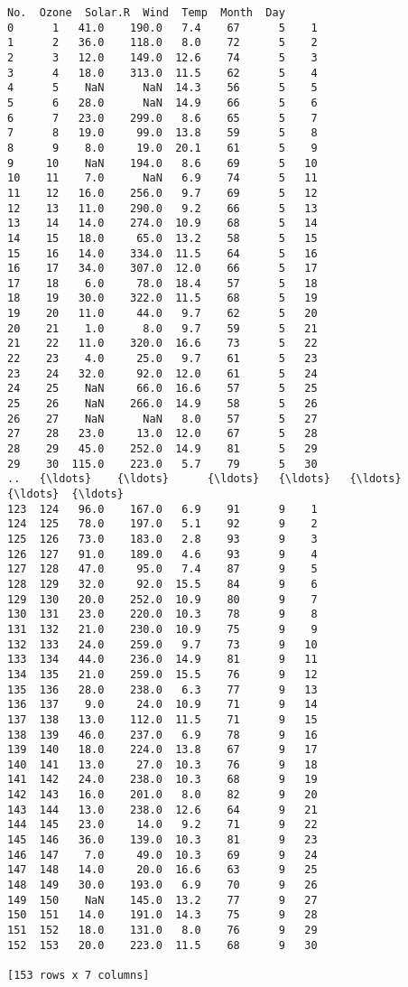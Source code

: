 \documentclass[11pt]{article}
\begin{document}
    \begin{Verbatim}[commandchars=\\\{\}]
     No.  Ozone  Solar.R  Wind  Temp  Month  Day
0      1   41.0    190.0   7.4    67      5    1
1      2   36.0    118.0   8.0    72      5    2
2      3   12.0    149.0  12.6    74      5    3
3      4   18.0    313.0  11.5    62      5    4
4      5    NaN      NaN  14.3    56      5    5
5      6   28.0      NaN  14.9    66      5    6
6      7   23.0    299.0   8.6    65      5    7
7      8   19.0     99.0  13.8    59      5    8
8      9    8.0     19.0  20.1    61      5    9
9     10    NaN    194.0   8.6    69      5   10
10    11    7.0      NaN   6.9    74      5   11
11    12   16.0    256.0   9.7    69      5   12
12    13   11.0    290.0   9.2    66      5   13
13    14   14.0    274.0  10.9    68      5   14
14    15   18.0     65.0  13.2    58      5   15
15    16   14.0    334.0  11.5    64      5   16
16    17   34.0    307.0  12.0    66      5   17
17    18    6.0     78.0  18.4    57      5   18
18    19   30.0    322.0  11.5    68      5   19
19    20   11.0     44.0   9.7    62      5   20
20    21    1.0      8.0   9.7    59      5   21
21    22   11.0    320.0  16.6    73      5   22
22    23    4.0     25.0   9.7    61      5   23
23    24   32.0     92.0  12.0    61      5   24
24    25    NaN     66.0  16.6    57      5   25
25    26    NaN    266.0  14.9    58      5   26
26    27    NaN      NaN   8.0    57      5   27
27    28   23.0     13.0  12.0    67      5   28
28    29   45.0    252.0  14.9    81      5   29
29    30  115.0    223.0   5.7    79      5   30
..   {\ldots}    {\ldots}      {\ldots}   {\ldots}   {\ldots}    {\ldots}  {\ldots}
123  124   96.0    167.0   6.9    91      9    1
124  125   78.0    197.0   5.1    92      9    2
125  126   73.0    183.0   2.8    93      9    3
126  127   91.0    189.0   4.6    93      9    4
127  128   47.0     95.0   7.4    87      9    5
128  129   32.0     92.0  15.5    84      9    6
129  130   20.0    252.0  10.9    80      9    7
130  131   23.0    220.0  10.3    78      9    8
131  132   21.0    230.0  10.9    75      9    9
132  133   24.0    259.0   9.7    73      9   10
133  134   44.0    236.0  14.9    81      9   11
134  135   21.0    259.0  15.5    76      9   12
135  136   28.0    238.0   6.3    77      9   13
136  137    9.0     24.0  10.9    71      9   14
137  138   13.0    112.0  11.5    71      9   15
138  139   46.0    237.0   6.9    78      9   16
139  140   18.0    224.0  13.8    67      9   17
140  141   13.0     27.0  10.3    76      9   18
141  142   24.0    238.0  10.3    68      9   19
142  143   16.0    201.0   8.0    82      9   20
143  144   13.0    238.0  12.6    64      9   21
144  145   23.0     14.0   9.2    71      9   22
145  146   36.0    139.0  10.3    81      9   23
146  147    7.0     49.0  10.3    69      9   24
147  148   14.0     20.0  16.6    63      9   25
148  149   30.0    193.0   6.9    70      9   26
149  150    NaN    145.0  13.2    77      9   27
150  151   14.0    191.0  14.3    75      9   28
151  152   18.0    131.0   8.0    76      9   29
152  153   20.0    223.0  11.5    68      9   30

[153 rows x 7 columns]

    \end{Verbatim}
\end{document}
